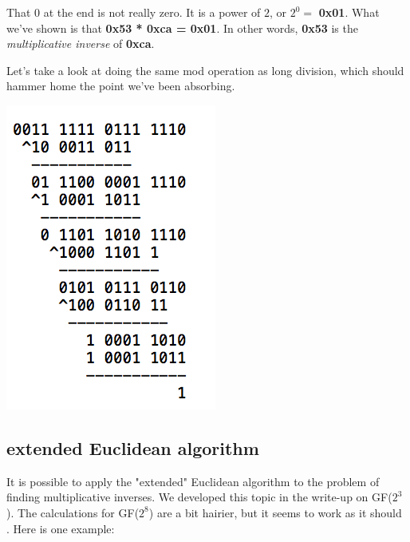 \documentclass[11pt, oneside]{article}
\begin{document}
That $0$ at the end is not really zero.  It is a power of $2$, or $2^0 =$ \textbf{0x01}.  What we've shown is that  \textbf{0x53 * 0xca = 0x01}.  In other words, \textbf{0x53} is the \emph{multiplicative inverse} of \textbf{0xca}.

Let's take a look at doing the same mod operation as long division, which should hammer  home the point we've been absorbing.
\begin{center} \includegraphics [scale=0.6] {figs/GFmath5.png} \end{center}

\subsection*{extended Euclidean algorithm}
It is possible to apply the "extended" Euclidean algorithm to the problem of finding multiplicative inverses.  We developed this topic in the write-up on GF($2^3$).  The calculations for GF($2^8$) are a bit hairier, but it seems to work as it should .  Here is one example:
\end{document}
